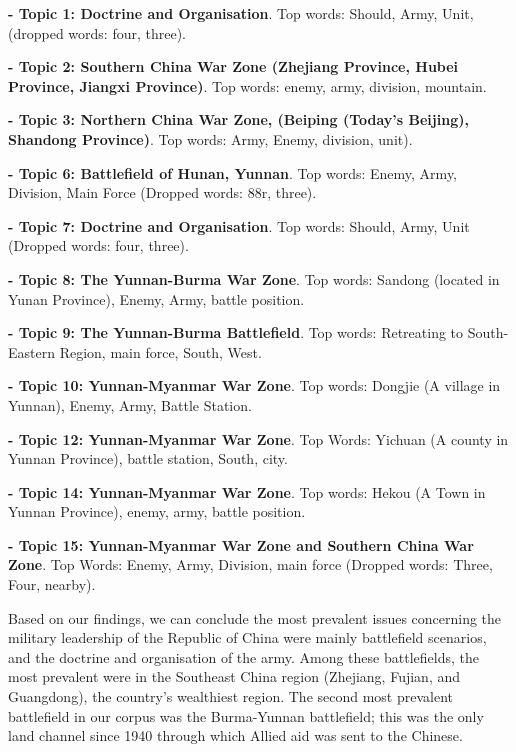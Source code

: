 \documentclass[12pt,letterpaper]{article}
\begin{document}
\begin{CJK*}{UTF8}{gbsn}
		\vspace{.1cm}

		\noindent \textbf{- Topic 1: Doctrine and Organisation}.
		Top words: Should, Army, Unit, (dropped words: four, three).
		
		\noindent \textbf{- Topic 2: Southern China War Zone (Zhejiang Province, Hubei Province, Jiangxi Province)}.
		Top words: enemy, army, division, mountain.
		
		\noindent \textbf{- Topic 3: Northern China War Zone, (Beiping (Today’s Beijing), Shandong Province)}.
		Top words: Army, Enemy, division, unit). 
			
		\noindent \textbf{- Topic 6: Battlefield of Hunan, Yunnan}.
		Top words: Enemy, Army, Division, Main Force (Dropped words: 88r, three).
			
		\noindent \textbf{- Topic 7: Doctrine and Organisation}.
		Top words: Should, Army, Unit (Dropped words: four, three).
			
		\noindent \textbf{- Topic 8: The Yunnan-Burma War Zone}. 
		Top words: Sandong (located in Yunan Province), Enemy, Army, battle position.
			
		\noindent \textbf{- Topic 9: The Yunnan-Burma Battlefield}.
		Top words: Retreating to South-Eastern Region, main force, South, West. 
			
		\noindent \textbf{- Topic 10: Yunnan-Myanmar War Zone}. 
		Top words: Dongjie (A village in Yunnan), Enemy, Army, Battle Station. 
			
		\noindent \textbf{- Topic 12: Yunnan-Myanmar War Zone}. 
		Top Words: Yichuan (A county in Yunnan Province), battle station, South, city. 
			
		\noindent \textbf{- Topic 14: Yunnan-Myanmar War Zone}.
		Top words: Hekou (A Town in Yunnan Province), enemy, army, battle position. 
			
		\noindent \textbf{- Topic 15: Yunnan-Myanmar War Zone and Southern China War Zone}. 
		Top Words: Enemy, Army, Division, main force (Dropped words: Three, Four, nearby).
	
		\vspace{.35cm}
		
		\noindent Based on our findings, we can conclude the most prevalent issues concerning the military leadership of the Republic of China were mainly battlefield scenarios, and the doctrine and organisation of the army. Among these battlefields, the most prevalent were in the Southeast China region (Zhejiang, Fujian, and Guangdong), the country’s wealthiest region. The second most prevalent battlefield in our corpus was the Burma-Yunnan battlefield; this was the only land channel since 1940 through which Allied aid was sent to the Chinese. 
		

\end{CJK*}
\end{document}
